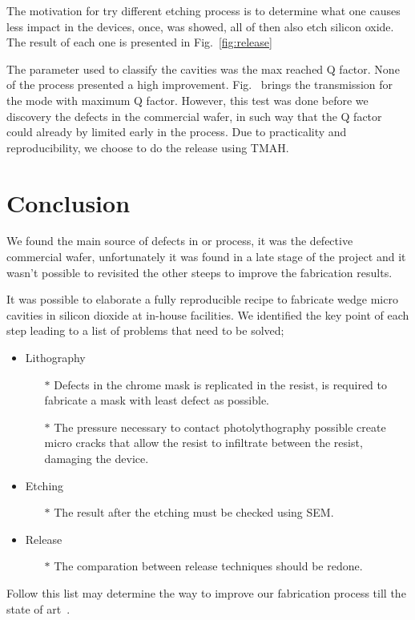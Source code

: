 The motivation for try different etching process is to determine what one causes less impact in the devices, once, was showed, all of then also etch silicon oxide. The result of each one is presented in Fig.~\ref{fig:release} 

The parameter used to classify the cavities was the max reached Q factor. None of the process presented a high improvement. Fig.~ brings the transmission for the mode with maximum Q factor. However, this test was done before we discovery the defects in the commercial wafer, in such way that the Q factor could already by limited early in the process. Due to practicality and reproducibility, we choose to do the release using TMAH.   
 
\section{Conclusion}

We found the main source of defects in or process, it was the defective commercial wafer, unfortunately it was found in a late stage of the project and it wasn't possible to revisited the other steeps to improve the fabrication results. 

It was possible to elaborate a fully reproducible recipe to fabricate wedge micro cavities in silicon dioxide at in-house facilities. We identified the key point of each step leading to a list of problems that need to be solved;
{
\begin{itemize}
    \item Lithography
    \begin{itemize}
        \item[$\ast$] Defects in the chrome mask is replicated in the resist, is required to fabricate a mask with least defect as possible. 
        \item[$\ast$] The pressure necessary to contact photolythography possible create micro cracks that allow the resist to infiltrate between the resist, damaging the device.
    \end{itemize}
    \item Etching
    \begin{itemize}    
        \item[$\ast$] The result after the etching must be checked using SEM.
    \end{itemize}
    \item Release
    \begin{itemize}
        \item[$\ast$] The comparation between release techniques should be redone.
    \end{itemize}
\end{itemize}
}
Follow this list may determine the way to improve our fabrication process till the state of art~\cite{Lee2012}. 




